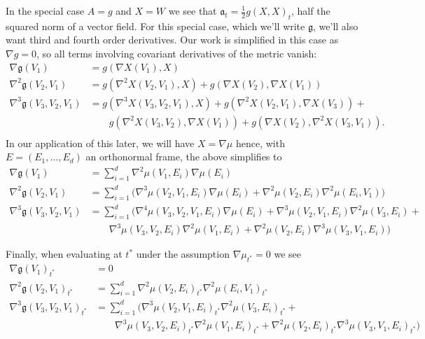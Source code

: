 \documentclass{article}
\begin{document}
In the special case $A=g$ and $X=W$ we see that $\mathfrak{a}_t = \frac{1}{2}g(X,X)_t$, half the squared norm
of a vector field. For this special case, which we'll write $\mathfrak{g}$, we'll also want third and fourth order derivatives. Our work
is simplified in this case as $\nabla g=0$, so all terms involving covariant derivatives of the metric vanish:
$$
\begin{aligned}
\nabla \mathfrak{g}(V_1) &= g(\nabla X(V_1), X) \\
\nabla^2 \mathfrak{g}(V_2, V_1) &= g(\nabla^2 X(V_2, V_1), X) + g(\nabla X(V_2), \nabla X(V_1)) \\
  \nabla^3 \mathfrak{g}(V_3, V_2, V_1)& = g(\nabla^3 X(V_3, V_2, V_1), X) + g(\nabla^2  X(V_2, V_1), \nabla X(V_3)) +  \\
  & \qquad g(\nabla^2 X(V_3, V_2), \nabla X(V_1)) + g(\nabla X(V_2), \nabla^2 X(V_3, V_1)). \\
\end{aligned}
$$
In our application of this later, we will have $X=\nabla \mu$ hence, with $E=(E_1, \dots, E_d)$ an orthonormal frame,
the above simplifies to
$$
\begin{aligned}
\nabla \mathfrak{g}(V_1) &= \sum_{i=1}^d \nabla^2 \mu(V_1, E_i) \nabla \mu(E_i) \\
\nabla^2 \mathfrak{g}(V_2, V_1) &= \sum_{i=1}^d 
\biggl(\nabla^3 \mu(V_2, V_1, E_i) \nabla \mu(E_i) + \nabla^2 \mu(V_2, E_i) \nabla^2 \mu(E_i, V_1) \biggr) \\
  \nabla^3 \mathfrak{g}(V_3, V_2, V_1)& = \sum_{i=1}^d
\biggl(\nabla^4 \mu(V_3, V_2, V_1, E_i) \nabla \mu(E_i) + \nabla^3  \mu(V_2, V_1, E_i) \nabla^2 \mu(V_3, E_i) +  \\
  & \qquad \nabla^3 \mu(V_3, V_2, E_i) \nabla^2 \mu(V_1, E_i) +  \nabla^2 \mu(V_2, E_i) \nabla^3 \mu(V_3, V_1, E_i) \biggr)
\end{aligned}
$$

Finally, when evaluating at $t^*$ under the assumption $\nabla \mu_{t^*}=0$ we see
\begin{equation}
  \label{eq:grad:density}
\begin{aligned}
\nabla \mathfrak{g}(V_1)_{t^*} &= 0 \\
\nabla^2 \mathfrak{g}(V_2, V_1)_{t^*} &= \sum_{i=1}^d 
 \nabla^2 \mu(V_2, E_i)_{t^*} \nabla^2 \mu(E_i, V_1)_{t^*} \\
  \nabla^3 \mathfrak{g}(V_3, V_2, V_1)_{t^*}& = \sum_{i=1}^d
\biggl(\nabla^3  \mu(V_2, V_1, E_i)_{t^*} \nabla^2 \mu(V_3, E_i)_{t^*} +  \\
  & \qquad \nabla^3 \mu(V_3, V_2, E_i)_{t^*} \nabla^2 \mu(V_1, E_i)_{t^*} +  \nabla^2 \mu(V_2, E_i)_{t^*} \nabla^3 \mu(V_3, V_1, E_i)_{t^*} \biggr)
\end{aligned}
\end{equation}
\end{document}
